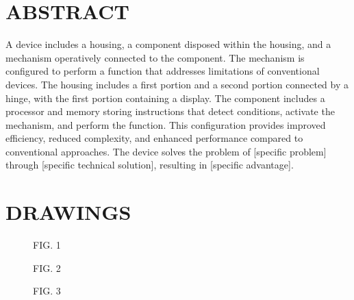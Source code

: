 \documentclass[12pt,letterpaper]{article}
\begin{document}
\newpage
\section*{ABSTRACT}


A device includes a housing, a component disposed within the housing, and a mechanism operatively connected to the component. The mechanism is configured to perform a function that addresses limitations of conventional devices. The housing includes a first portion and a second portion connected by a hinge, with the first portion containing a display. The component includes a processor and memory storing instructions that detect conditions, activate the mechanism, and perform the function. This configuration provides improved efficiency, reduced complexity, and enhanced performance compared to conventional approaches. The device solves the problem of [specific problem] through [specific technical solution], resulting in [specific advantage].

\newpage
\section*{DRAWINGS}


\begin{figure}[h]
\centering
{}
\caption*{FIG. 1}
\end{figure}

\begin{figure}[h]
\centering
{}
\caption*{FIG. 2}
\end{figure}

\begin{figure}[h]
\centering
{}
\caption*{FIG. 3}
\end{figure}

\end{document}
